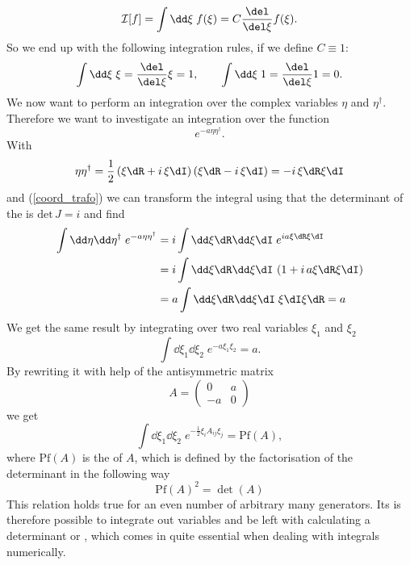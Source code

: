 \begin{equation}
\mathcal{I}[f]=\int \dd\xi\; f(\xi) = C\frac{\del }{\del\xi}f(\xi).
\end{equation}
So we end up with the following integration rules, if we define $C\equiv 1$:
\begin{equation}
\int \dd\xi\; \xi = \frac{\del }{\del\xi}\xi =1,\qquad \int \dd\xi\; 1 = \frac{\del }{\del\xi}1 =0.
\end{equation}
We now want to perform an integration over the complex  variables $\eta$ and $\eta^{\dagger}$. Therefore we want to investigate an integration over the function
\begin{equation}
e ^{-a\eta\eta^{\dagger}}.
\end{equation}
With
\begin{equation}
\eta\eta^{\dagger} = \frac{1}{2}\left(\xi\dR+i\,\xi\dI\right)\left(\xi\dR-i\, \xi\dI\right) = -i\,\xi\dR\xi\dI
\end{equation}
and (\ref{coord_trafo}) we can transform the integral using that the determinant of the  is $\mathrm{det}\,J=i$ and find
\begin{align}
\int \dd\eta\dd\eta^{\dagger}\;e ^{-a\eta\eta^{\dagger}} &= i\int \dd\xi\dR \dd\xi\dI\; e ^{ia\xi\dR\xi\dI}\notag \\
%
%
&=i\int\dd\xi\dR\dd\xi\dI\, \left( 1+ i\,a\xi\dR\xi\dI \right) \\
%
%
&=a \int\dd\xi\dR\dd\xi\dI \;\xi\dI\xi\dR = a \notag
\end{align}
We get the same result by integrating over two real  variables $\xi_{1}$ and $\xi_{2}$
\begin{equation}
\int \dd\xi_{1}\dd\xi_{2}\; e ^{-a\xi_{1}\xi_{2}}=a.
\end{equation}
By rewriting it with help of the antisymmetric matrix
\begin{equation}
A=\left(\begin{array}{cc}
0 & a \\
-a & 0
\end{array} \right)
\end{equation}
we get
\begin{equation}
\int \dd\xi_{1}\dd\xi_{2}\; e ^{-\frac{1}{2}\xi_{i}A_{ij}\xi_{j}} = \mathrm{Pf}\left(A\right),
\end{equation}
where $\mathrm{Pf}\left(A\right)$ is the  of $A$, which is defined by the factorisation of the determinant in the following way
%
%
\begin{equation}
\mathrm{Pf}\left(A\right)^{2} = \det(A)
\end{equation}
This relation holds true for an even number of arbitrary many  generators. Its is therefore possible to integrate out  variables and be left with calculating a determinant or , which comes in quite essential when dealing with  integrals numerically.
%
%
%
%
%
%
%
%
